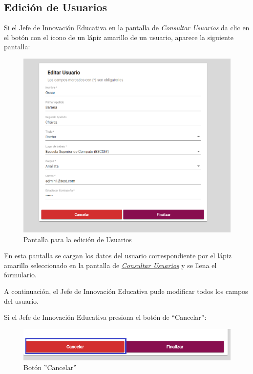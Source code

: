\newpage

\hypertarget{editar-user-JIE}{}
\subsection{Edición de Usuarios}
Si el Jefe de Innovación Educativa en la pantalla de \hyperlink{consultarUs-JIE}{\textit{Consultar Usuarios}} da clic en el botón con el icono de un lápiz amarillo de un usuario, aparece la siguiente pantalla:

\begin{figure}[H]
	\centering
	\hypertarget{editarUs-JIE}{\includegraphics[width=0.6\linewidth]{images/SP5/Editar-Usuario}}
	\caption{Pantalla para la edición de Usuarios}
	\label{editarrh}
\end{figure}

En esta pantalla se cargan los datos del usuario correspondiente por el lápiz amarillo seleccionado en la pantalla de \hyperlink{consultarUs-JIE}{\textit{Consultar Usuarios}} y se llena el formulario.

A continuación, el Jefe de Innovación Educativa pude modificar todos los campos del usuario.

Si el Jefe de Innovación Educativa presiona el botón de “Cancelar”:

\begin{figure}[H]
	\centering
	\hypertarget{cancel2-JIE}{\includegraphics[width=0.7\linewidth]{images/SP5/BtnCancelar2}}
	\caption{Botón ''Cancelar''}
	\label{cancel2-JIE}
\end{figure}


